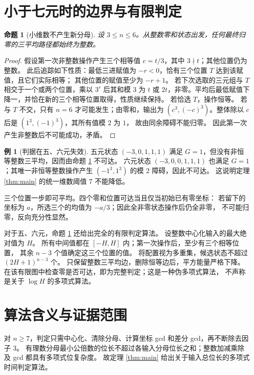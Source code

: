 \documentclass[UTF8,fontset=fandol,zihao=-4,a4paper]{ctexart}
\numberwithin{equation}{section}
\newtheorem{proposition}[theorem]{命题}
\theoremstyle{definition}
\newtheorem{example}[theorem]{例}
\begin{document}
\section{小于七元时的边界与有限判定}\label{sec:boundary}

\begin{proposition}[小维数不产生新分母]\label{prop:small-integral}
设 $3\le n\le6$。从整数零和状态出发，任何最终归零的三平均路径都始终为整数。
\end{proposition}
\begin{proof}
假设第一次非整数操作产生三个相等值 $c=t/3$，其中 $3\nmid t$；其他位置仍为整数。
此后追踪如下性质：最低三进赋值为 $-r<0$，恰有三个位置 $T$ 达到该赋值，且它们实际相等；
其他位置的赋值至少为 $-r+1$。
若下次选取的三元组与 $T$ 相交于一个或两个位置，乘以 $3^r$ 后其和模 $3$ 为
$t$ 或 $2t$，非零。平均后最低赋值下降一，并恰在新的三个相等位置取得，性质继续保持。
若恰选 $T$，操作恒等。
若与 $T$ 不交，只有 $n=6$ 才可能发生；由零和，输出为
$(c^3,(-c)^3)$。整体除以 $c$ 后是 $(1^3,(-1)^3)$，其所有值模 $2$ 为 $1$，
故由同余障碍不能归零。
因此第一次产生非整数后不可能成功，矛盾。
\end{proof}

\begin{example}[判据在五、六元失效]
五元状态 $(-3,0,1,1,1)$ 满足 $G=1$，但没有非恒等整数三平均，因而由命题
\ref{prop:small-integral} 不可达。
六元状态 $(-3,0,0,1,1,1)$ 也满足 $G=1$；其唯一非恒等整数操作产生
$(-1^3,1^3)$ 的模 $2$ 障碍，因此不可达。
这说明定理 \ref{thm:main} 的统一维数阈值 $7$ 不能降低。
\end{example}

三个位置一步即可平均。四个零和位置可达当且仅当初始已有零坐标：
若留下的坐标为 $a$，所选三个的均值为 $-a/3$；因此全非零状态操作后仍全非零，
不可能归零，反向充分性显然。

对于五、六元，命题 \ref{prop:small-integral} 还给出完全的有限判定算法。
设整数中心化输入的最大绝对值为 $H$。
所有中间值都在 $[-H,H]$ 内；第一次操作后，至少有三个相等位置，
其余 $n-3$ 个值确定这三个位置的值。
将配置视为多重集，候选状态不超过 $(2H+1)^{n-3}$ 个。
只保留整数三平均边，删除恒等边后，平方能量严格下降。
在该有限图中检查零是否可达，即为完整判定；这是一种伪多项式算法，
不声称是关于 $\log H$ 的多项式算法。

\section{算法含义与证据范围}\label{sec:algorithm}

对 $n\ge7$，判定只需中心化、清除分母、计算坐标 gcd 和差分 gcd，再不断除去因子 $3$。
有理数分母最小公倍数的位长不超过各输入分母位长之和；整数加减乘除及 gcd 都具有多项式位复杂度。
故定理 \ref{thm:main} 给出关于输入总位长的多项式时间判定算法。
\end{document}

